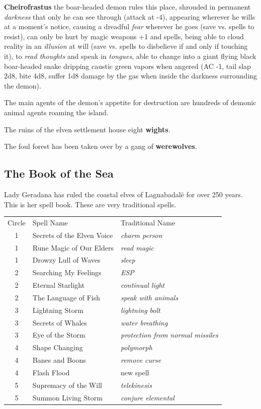 \documentclass[11pt]{bxart}
\begin{document}
\textbf{Cheirofrastus} the boar-headed demon rules this place,
shrouded in permanent \emph{darkness} that only he can see through
(attack at -4), appearing wherever he wills at a moment's notice,
causing a dreadful \emph{fear} wherever he goes (save vs. spells to
resist), can only be hurt by magic weapons +1 and spells, being able
to cloud reality in an \emph{illusion} at will (save vs. spells to
disbelieve if and only if touching it), to \emph{read thoughts} and
speak in \emph{tongues}, able to change into a giant flying black
boar-headed snake dripping caustic green vapors when angered (AC -1,
tail slap 2d8, bite 4d8, suffer 1d8 damage by the gas when inside the
darkness surrounding the demon).

The main agents of the demon's appetite for destruction are hundreds
of demonic animal agents roaming the island.

The ruins of the elven settlement house eight \textbf{wights}.

The foul forest has been taken over by a gang of \textbf{werewolves}.

\subsection{The Book of the Sea}
\label{sec:book-of-the-sea}

Lady Geradana has ruled the coastal elves of Lagnabadalë for over 250
years. This is her spell book. These are very traditional spells.

\begin{table}[!h]
  \small
  \centering
  \begin{tabular}{cll}
    Circle & Spell Name & Traditional Name \\
    \cmidrule(lr){1-1}\cmidrule(lr){2-2}\cmidrule(lr){3-3}
    1 & Secrets of the Elven Voice & \emph{charm person} \\
    1 & Rune Magic of Our Elders & \emph{read magic} \\
    1 & Drowzy Lull of Waves & \emph{sleep} \\
    2 & Searching My Feelings & \emph{ESP} \\
    2 & Eternal Starlight & \emph{continual light} \\
    2 & The Language of Fish & \emph{speak with animals} \\
    3 & Lightning Storm & \emph{lightning bolt} \\
    3 & Secrets of Whales & \emph{water breathing} \\
    3 & Eye of the Storm & \emph{protection from normal missiles} \\
    4 & Shape Changing & \emph{polymorph}\\
    4 & Banes and Boons & \emph{remove curse} \\
    4 & Flash Flood & new spell \\
    5 & Supremacy of the Will & \emph{telekinesis} \\
    5 & Summon Living Storm & \emph{conjure elemental} \\
  \end{tabular}
\end{table}
\end{document}
